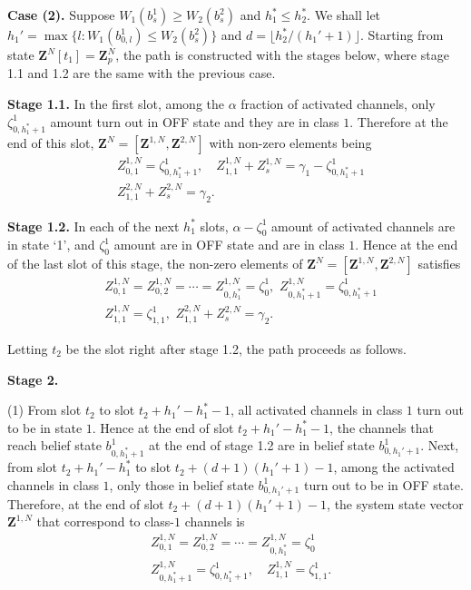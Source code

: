 \documentclass[11pt,twocolumn]{IEEEtran}
\begin{document}
\noindent \textbf{Case (2).} Suppose $W_1(b^1_s)\geq W_2(b^2_s)$ and $h^*_1 \leq h^*_2$. We shall let $h_1'=\max\{l: W_1(b^1_{0,l}) \leq  W_2(b^2_s)\}$ and $d=\lfloor h^*_2 / (h_1'+1) \rfloor$. Starting from state $\bm Z^N[t_1]=\bm Z^N_p$, the path is constructed with the stages below, where stage 1.1 and 1.2 are the same with the previous case.
\hspace{10pt}

\noindent\textbf{Stage 1.1.} In the first slot, among the $\alpha$ fraction of activated channels, only $\zeta^1_{0,h_1^*+1}$ amount turn out in OFF state and they are in class $1$. Therefore at the end of this slot, $\bm Z^N=[\bm Z^{1,N}, \bm Z^{2,N}]$ with non-zero elements being
\begin{align}
&Z^{1,N}_{0,1}=\zeta^1_{0,h_1^*+1}, \quad Z^{1,N}_{1,1}+ Z^{1,N}_{s}=\gamma_1-\zeta^1_{0,h_1^*+1}\nonumber\\
&Z^{2,N}_{1,1}+Z^{2,N}_{s}=\gamma_2. \nonumber
\end{align}

\noindent\textbf{Stage 1.2.} In each of the next $h_1^*$ slots, $\alpha-\zeta^1_0$ amount of activated channels are in state `1', and $\zeta^1_0$ amount are in OFF state and are in class $1$. Hence at the end of the last slot of this stage, the non-zero elements of $\bm Z^N=[\bm Z^{1,N}, \bm Z^{2,N}]$ satisfies
\begin{align}
&Z^{1,N}_{0,1}=Z^{1,N}_{0,2}=\cdots=Z^{1,N}_{0,h_1^*} = \zeta^1_0, \hspace{4pt} Z^{1,N}_{0,h_1^*{+}1}=\zeta^1_{0,h_1^*{+}1}\nonumber\\
&Z^{1,N}_{1,1}=\zeta^1_{1,1}, \hspace{4pt} Z^{2,N}_{1,1}+Z^{2,N}_s=\gamma_2. \nonumber
\end{align}

Letting $t_2$ be the slot right after stage 1.2, the path proceeds as follows.
\vspace{7pt}

\noindent\textbf{Stage 2.}

\noindent(1) From slot $t_2$ to slot $t_2+h_1'-h_1^*-1$, all activated channels in class $1$ turn out to be in state $1$. Hence at the end of slot $t_2+h_1'-h_1^*-1$, the channels that reach belief state $b^1_{0,h_1^*{+}1}$ at the end of stage 1.2 are in belief state $b^1_{0,h_1'+1}$. Next, from slot $t_2+h_1'-h_1^*$ to slot $t_2+(d+1)(h_1'+1)-1$, among the activated channels in class $1$, only those in belief state $b^1_{0,h_1'{+}1}$  turn out to be in OFF state. Therefore, at the end of slot $t_2+(d+1)(h_1'+1)-1$, the system state vector $\bm Z^{1,N}$ that correspond to class-$1$ channels is
\begin{align}
&Z^{1,N}_{0,1}=Z^{1,N}_{0,2}=\cdots=Z^{1,N}_{0,h_1^*}=\zeta^1_0\nonumber\\
&Z^{1,N}_{0,h_1^*{+}1}= \zeta^1_{0,h_1^*{+}1}, \quad Z^{1,N}_{1,1}= \zeta^1_{1,1}. \nonumber
\end{align}
\end{document}
